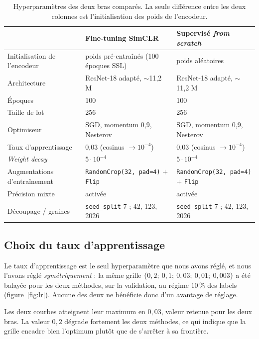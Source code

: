 \documentclass[11pt,a4paper]{article}
\begin{document}
\begin{table}[htbp]
\centering\small
\caption{Hyperparamètres des deux bras comparés. La seule différence entre les deux colonnes
est l'initialisation des poids de l'encodeur.}
\label{tab:hyper}
\begin{tabularx}{\textwidth}{@{}lXX@{}}
\toprule
& \textbf{Fine-tuning SimCLR} & \textbf{Supervisé \emph{from scratch}} \\
\midrule
Initialisation de l'encodeur & poids pré-entraînés (100 époques SSL) & poids aléatoires \\
Architecture & ResNet-18 adapté, $\sim$11,2 M & ResNet-18 adapté, $\sim$11,2 M \\
Époques & 100 & 100 \\
Taille de lot & 256 & 256 \\
Optimiseur & SGD, momentum 0,9, Nesterov & SGD, momentum 0,9, Nesterov \\
Taux d'apprentissage & 0,03 (cosinus $\rightarrow 10^{-4}$) & 0,03 (cosinus $\rightarrow 10^{-4}$) \\
\emph{Weight decay} & $5\cdot10^{-4}$ & $5\cdot10^{-4}$ \\
Augmentations d'entraînement & \texttt{RandomCrop(32, pad=4)} $+$ \texttt{Flip} & \texttt{RandomCrop(32, pad=4)} $+$ \texttt{Flip} \\
Précision mixte & activée & activée \\
Découpage / graines & \texttt{seed\_split} 7 ; 42, 123, 2026 & \texttt{seed\_split} 7 ; 42, 123, 2026 \\
\bottomrule
\end{tabularx}
\end{table}

\subsection{Choix du taux d'apprentissage}

Le taux d'apprentissage est le seul hyperparamètre que nous avons réglé, et nous l'avons
réglé \emph{symétriquement} : la même grille $\{0{,}2;\ 0{,}1;\ 0{,}03;\ 0{,}01;\ 0{,}003\}$
a été balayée pour les deux méthodes, sur la validation, au régime $10\,\%$ des labels
(figure~\ref{fig:lr}). Aucune des deux ne bénéficie donc d'un avantage de réglage.

Les deux courbes atteignent leur maximum en $0{,}03$, valeur retenue pour les deux bras.
La valeur $0{,}2$ dégrade fortement les deux méthodes, ce qui indique que la grille encadre
bien l'optimum plutôt que de s'arrêter à sa frontière.
\end{document}
